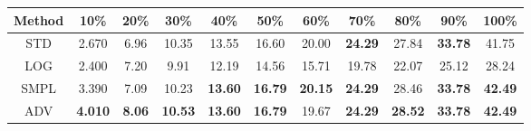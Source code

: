 \documentclass{standalone}
\begin{document}
\begin{tabular}{c|cccccccccc}
      \toprule
      Method & 10\% & 20\% & 30\% & 40\% & 50\% & 60\% & 70\% & 80\% & 90\% & 100\% \\
      \midrule
STD & 2.670 & 6.96 & 10.35 & 13.55 & 16.60 & 20.00 & \textbf{24.29} & 27.84 & \textbf{33.78} & 41.75\\
LOG & 2.400 & 7.20 & 9.91 & 12.19 & 14.56 & 15.71 & 19.78 & 22.07 & 25.12 & 28.24\\
SMPL & 3.390 & 7.09 & 10.23 & \textbf{13.60} & \textbf{16.79} & \textbf{20.15} & \textbf{24.29} & 28.46 & \textbf{33.78} & \textbf{42.49}\\
ADV & \textbf{4.010} & \textbf{8.06} & \textbf{10.53} & \textbf{13.60} & \textbf{16.79} & 19.67 & \textbf{24.29} & \textbf{28.52} & \textbf{33.78} & \textbf{42.49}\\
  \bottomrule
\end{tabular}
\end{document}
